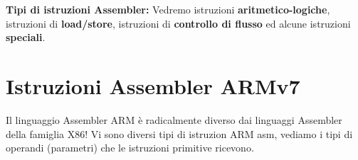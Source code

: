 \begin{defn}
\textbf{Tipi di istruzioni Assembler:}
Vedremo istruzioni \textbf{aritmetico-logiche}, istruzioni di \textbf{load/store}, istruzioni di \textbf{controllo di flusso} ed alcune istruzioni \textbf{speciali}.
\end{defn}

\section{Istruzioni Assembler ARMv7}

\begin{note}
Il linguaggio Assembler ARM è radicalmente diverso dai linguaggi Assembler della famiglia X86! Vi sono diversi tipi di istruzion ARM asm, vediamo i tipi di operandi (parametri) che le istruzioni primitive ricevono.
\end{note}


